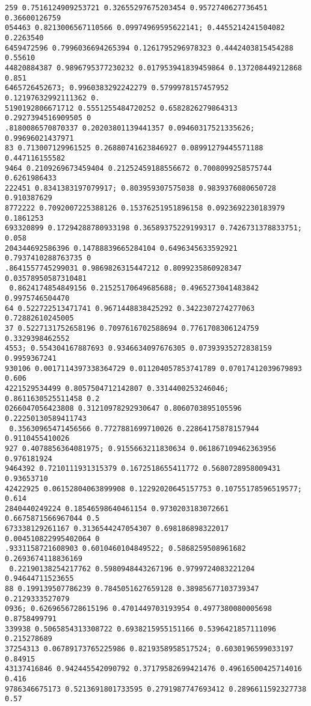 \documentclass[12pt,a4paper]{article}
\begin{document}
\begin{lstlisting}
259 0.7516124909253721 0.32655297675203454 0.9572740627736451 0.36600126759
054463 0.8213006567110566 0.09974969595622141; 0.4455214241504082 0.2263540
6459472596 0.7996036694265394 0.1261795296978323 0.4442403815454288 0.55610
44820884387 0.9896795377230232 0.017953941839459864 0.137208449212868 0.851
6465726452673; 0.9960383292242279 0.5799978157457952 0.12197632992111362 0.
5190192806671712 0.5551255484720252 0.6582826279864313 0.2927394516909505 0
.8180086570870337 0.20203801139441357 0.09460317521335626; 0.99696021437971
83 0.713007129961525 0.26880741623846927 0.08991279445571188 0.447116155582
9464 0.2109269673459404 0.21252459188556672 0.7008099258575744 0.6261986433
222451 0.8341383197079917; 0.803959307575038 0.9839376080650728 0.910387629
8772222 0.7092007225388126 0.15376251951896158 0.0923692230183979 0.1861253
693320899 0.17294288780933198 0.36589375229199317 0.7426731378833751; 0.058
204344692586396 0.14788839665284104 0.6496345633592921 0.7937410288763735 0
.8641557745299031 0.9869826315447212 0.8099235860928347 0.03578950587310481
 0.8624174854849156 0.21525170649685688; 0.4965273041483842 0.9975746504470
64 0.522722513471741 0.9671448838425292 0.3422307274277063 0.72882610245005
37 0.5227131752658196 0.7097616702588694 0.7761708306124759 0.3329398462552
4553; 0.554304167887693 0.9346634097676305 0.07393935272838159 0.9959367241
930106 0.0017114397338364729 0.011204057853741789 0.07017412039679893 0.606
4221529534499 0.8057504712142807 0.3314400253246046; 0.8611630525511458 0.2
0266047056423808 0.31210978292930647 0.8060703895105596 0.22250130589411743
 0.35630965471456566 0.7727881699710026 0.22864175878157944 0.9110455410026
927 0.4078856364081975; 0.9155663211830634 0.061867109462363956 0.976181924
9464392 0.7210111931315379 0.1672518655411772 0.5680728958009431 0.93653710
42422925 0.06152804063899908 0.12292020645157753 0.10755178596519577; 0.614
2840440249224 0.18546598640461154 0.9730203183072661 0.6675871566967044 0.5
673338129261167 0.3136544247054307 0.698186898322017 0.004510822995402064 0
.9331158721608903 0.6010460104849522; 0.5868259508961682 0.2693674118836169
 0.22190138254217762 0.5980948443267196 0.9799724083221204 0.94644711523655
88 0.199139507786239 0.7845051627659128 0.38985677103739347 0.2129333527079
0936; 0.6269656728615196 0.4701449703193954 0.4977380080005698 0.8758499791
339938 0.5065854313308722 0.6938215955151166 0.5396421857111096 0.215278689
37254313 0.06789173765225986 0.8219358958517524; 0.6030196599033197 0.84915
43137416846 0.942445542090792 0.37179582699421476 0.49616500425714016 0.416
9786346675173 0.5213691801733595 0.2791987747693412 0.2896611592327738 0.57

\end{lstlisting}
\end{document}
